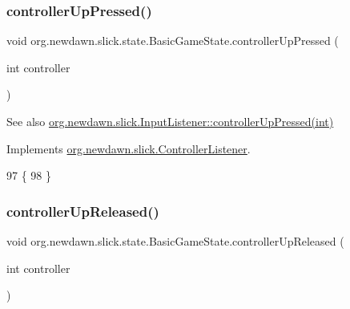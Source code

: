 \subsubsection{\texorpdfstring{controller\+Up\+Pressed()}{controllerUpPressed()}}
{\footnotesize\ttfamily void org.\+newdawn.\+slick.\+state.\+Basic\+Game\+State.\+controller\+Up\+Pressed (\begin{DoxyParamCaption}\item[{int}]{controller }\end{DoxyParamCaption})\hspace{0.3cm}{\ttfamily [inline]}}

\begin{DoxySeeAlso}{See also}
\mbox{\hyperlink{interfaceorg_1_1newdawn_1_1slick_1_1_controller_listener_a7cb917761de1e555b23469042b6f1e03}{org.\+newdawn.\+slick.\+Input\+Listener\+::controller\+Up\+Pressed(int)}} 
\end{DoxySeeAlso}


Implements \mbox{\hyperlink{interfaceorg_1_1newdawn_1_1slick_1_1_controller_listener_a7cb917761de1e555b23469042b6f1e03}{org.\+newdawn.\+slick.\+Controller\+Listener}}.


\begin{DoxyCode}
97                                                     \{
98     \}
\end{DoxyCode}
\mbox{\label{classorg_1_1newdawn_1_1slick_1_1state_1_1_basic_game_state_af4be493c79ad2ee89aed6f64b2ebd9fa}} 
\subsubsection{\texorpdfstring{controller\+Up\+Released()}{controllerUpReleased()}}
{\footnotesize\ttfamily void org.\+newdawn.\+slick.\+state.\+Basic\+Game\+State.\+controller\+Up\+Released (\begin{DoxyParamCaption}\item[{int}]{controller }\end{DoxyParamCaption})\hspace{0.3cm}{\ttfamily [inline]}}

